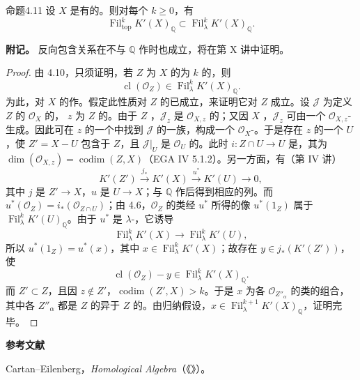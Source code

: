\begin{SGAresult}{命题}{4.11}
设 $X$ 是有的。则对每个 $k\geq0$，有
\[
\operatorname{Fil}_{\mathrm{top}}^kK'(X)_{\mathbb Q}\subset\operatorname{Fil}_{\lambda}^kK'(X)_{\mathbb Q}.
\]
\end{SGAresult}
\textbf{附记。} 反向包含关系在不与 $\mathbb Q$ 作时也成立，将在第 X 讲中证明。
\begin{proof}
由 4.10，只须证明，若 $Z$ 为 $X$ 的为 $k$ 的，则
\[
\operatorname{cl}(\mathcal O_Z)\in\operatorname{Fil}_{\lambda}^kK'(X)_{\mathbb Q}.
\]
为此，对 $X$ 的作。假定此性质对 $Z$ 的已成立，来证明它对 $Z$ 成立。设 $\mathcal J$ 为定义 $Z$ 的 $\mathcal O_X$ 的，
$z$ 为 $Z$ 的。由于 $Z$ ，$\mathcal J_z$ 是 $\mathcal O_{X,z}$ 的；又因 $X$ ，$\mathcal J_z$ 可由一个 $\mathcal O_{X,z}$-生成。因此可在 $z$ 的一个中找到 $\mathcal J$ 的一族，构成一个 $\mathcal O_X$-。于是存在 $z$ 的一个 $U$，使 $Z'=X-U$ 包含于 $Z$，且 $\mathcal J|_U$ 是 $\mathcal O_U$ 的。此时 $i:Z\cap U\to U$ 是，其为 $\dim(\mathcal O_{X,z})=\operatorname{codim}(Z,X)$（EGA IV 5.1.2）。另一方面，有（第 IV 讲）
\[
K'(Z')\xrightarrow{j_*}K'(X)\xrightarrow{u^*}K'(U)\longrightarrow0,
\]
其中 $j$ 是 $Z'\to X$，$u$ 是 $U\to X$；与 $\mathbb Q$ 作后得到相应的列。而 $u^*(\mathcal O_Z)=i_*(\mathcal O_{Z\cap U})$；由 4.6，$\mathcal O_Z$ 的类经 $u^*$ 所得的像 $u^*(1_Z)$ 属于 $\operatorname{Fil}_{\lambda}^kK'(U)_{\mathbb Q}$。由于 $u^*$ 是 $\lambda$-，它诱导
\[
\operatorname{Fil}_{\lambda}^kK'(X)\longrightarrow\operatorname{Fil}_{\lambda}^kK'(U),
\]
所以 $u^*(1_Z)=u^*(x)$，其中 $x\in\operatorname{Fil}_{\lambda}^kK'(X)$；故存在 $y\in j_*(K'(Z'))$，使
\[
\operatorname{cl}(\mathcal O_Z)-y\in\operatorname{Fil}_{\lambda}^kK'(X)_{\mathbb Q}.
\]
而 $Z'\subset Z$，且因 $z\notin Z'$，$\operatorname{codim}(Z',X)>k$。于是 $x$ 为各 $\mathcal O_{Z''_\alpha}$ 的类的组合，其中各 $Z''_\alpha$ 都是 $Z$ 的异于 $Z$ 的。由归纳假设，$x\in\operatorname{Fil}_{\lambda}^{k+1}K'(X)_{\mathbb Q}$，证明完毕。
\end{proof}

\begin{center}\textbf{参考文献}\end{center}
\noindent [1] Cartan--Eilenberg，\textit{Homological Algebra}（《》）。
